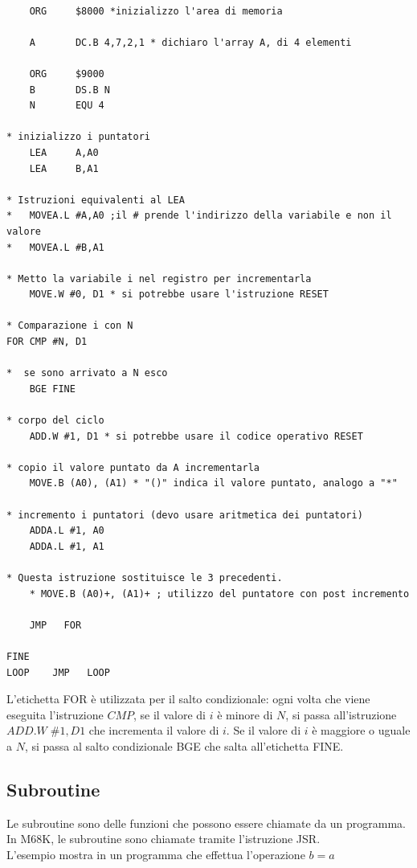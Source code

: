 \documentclass{article}
\begin{document}
\begin{lstlisting}[caption={Copia di un vettore in Assembler},language={[Motorol
a68k]Assembler}]

    ORG     $8000 *inizializzo l'area di memoria

    A       DC.B 4,7,2,1 * dichiaro l'array A, di 4 elementi

    ORG     $9000
    B       DS.B N
    N       EQU 4

* inizializzo i puntatori
    LEA     A,A0 
    LEA     B,A1

* Istruzioni equivalenti al LEA
*   MOVEA.L #A,A0 ;il # prende l'indirizzo della variabile e non il valore
*   MOVEA.L #B,A1

* Metto la variabile i nel registro per incrementarla
    MOVE.W #0, D1 * si potrebbe usare l'istruzione RESET

* Comparazione i con N
FOR CMP #N, D1

*  se sono arrivato a N esco
    BGE FINE

* corpo del ciclo
    ADD.W #1, D1 * si potrebbe usare il codice operativo RESET

* copio il valore puntato da A incrementarla
    MOVE.B (A0), (A1) * "()" indica il valore puntato, analogo a "*"

* incremento i puntatori (devo usare aritmetica dei puntatori)
    ADDA.L #1, A0
    ADDA.L #1, A1

* Questa istruzione sostituisce le 3 precedenti.
    * MOVE.B (A0)+, (A1)+ ; utilizzo del puntatore con post incremento

    JMP   FOR

FINE 
LOOP    JMP   LOOP
\end{lstlisting}

L'etichetta FOR è utilizzata per il salto condizionale: ogni volta che viene 
eseguita l'istruzione $CMP$, se il valore di $i$ è minore di $N$, si passa
all'istruzione $ADD.W\;\#1, D1$
che incrementa il valore di $i$. Se il valore di $i$ è maggiore o uguale a $N$, 
si passa al salto condizionale BGE che salta all'etichetta FINE.\\

\subsection{Subroutine}
Le subroutine sono delle funzioni che possono essere chiamate da un programma.
In M68K, le subroutine sono chiamate tramite l'istruzione JSR.\\
L'esempio mostra in un programma che effettua l'operazione $b = a$
\end{document}
